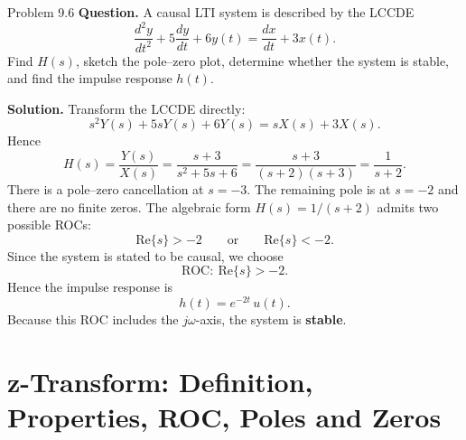\documentclass[10pt]{article}
\newcommand{\ROC}{\mathrm{ROC}}
\newcommand{\Prompt}[1]{\textbf{Question.} #1}
\newcommand{\SketchLabel}{\tcblower\textbf{Solution.}}
\begin{document}
\begin{examplebox}{Problem 9.6}
  \Prompt{A causal LTI system is described by the LCCDE
    \[
      \frac{d^2 y}{dt^2}+5\frac{dy}{dt}+6y(t)=\frac{dx}{dt}+3x(t).
    \]
  Find \(H(s)\), sketch the pole--zero plot, determine whether the system is stable, and find the impulse response \(h(t)\).}

  \medskip
  \SketchLabel{}
  Transform the LCCDE directly:
  \[
    s^2 Y(s)+5sY(s)+6Y(s)=sX(s)+3X(s).
  \]
  Hence
  \[
    H(s)=\frac{Y(s)}{X(s)}=\frac{s+3}{s^2+5s+6}=\frac{s+3}{(s+2)(s+3)}=\frac{1}{s+2}.
  \]
  There is a pole--zero cancellation at \(s=-3\). The remaining pole is at \(s=-2\) and there are no finite zeros.
  The algebraic form \(H(s)=1/(s+2)\) admits two possible ROCs:
  \[
    \text{Re}\{s\}>-2
    \qquad \text{or} \qquad
    \text{Re}\{s\}<-2.
  \]
  Since the system is stated to be causal, we choose
  \[
    \ROC:\ \text{Re}\{s\}>-2.
  \]
  Hence the impulse response is
  \[
    h(t)=e^{-2t}\,u(t).
  \]
  Because this ROC includes the \(j\omega\)-axis, the system is \textbf{stable}.

  \begin{center}
  \end{center}
\end{examplebox}

\section{z-Transform: Definition, Properties, ROC, Poles and Zeros}
\end{document}
